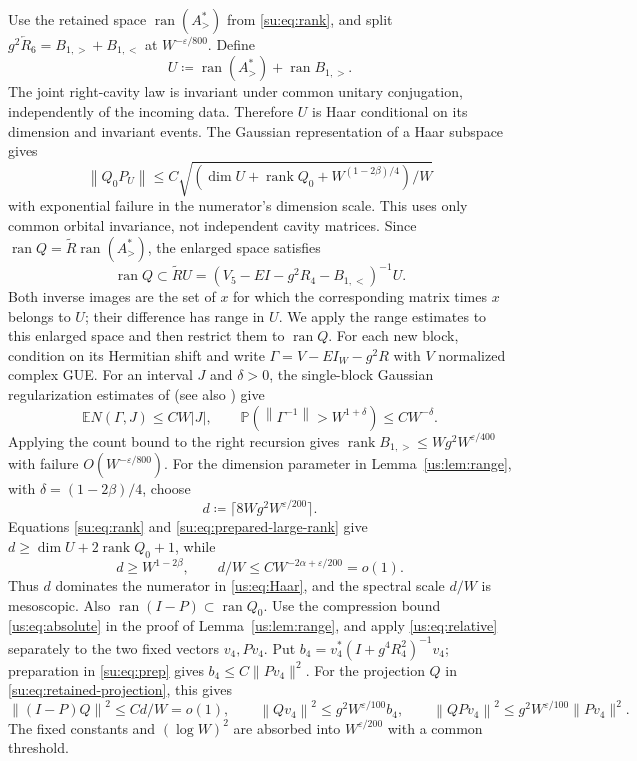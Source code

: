 \documentclass[11pt]{article}
\numberwithin{equation}{section}
\theoremstyle{remark}
\newcommand{\E}{\mathbb E}
\newcommand{\Prob}{\mathbb P}
\newcommand{\rank}{\operatorname{rank}}
\newcommand{\ran}{\operatorname{ran}}
\newcommand{\norm}[1]{\left\|#1\right\|}
\begin{document}
Use the retained space $\ran(A_>^*)$ from \eqref{su:eq:rank}, and split $g^2 \overleftarrow R_6=B_{1,>}+B_{1,<}$ at $W^{-\varepsilon/800}$.
Define
\[
 U\coloneqq \ran(A_>^*)+\ran B_{1,>}.
\]
The joint right-cavity law is invariant under
common unitary conjugation, independently of the incoming data. Therefore
$U$ is Haar conditional on its dimension and invariant events.
The Gaussian representation of a Haar subspace gives
\begin{equation}
 \norm{Q_0P_U}\le C\sqrt{(\dim U+\rank Q_0+W^{(1-2\beta)/4})/W}
 \label{us:eq:Haar}
\end{equation}
with exponential failure in the numerator's dimension scale.
This uses only common orbital invariance, not independent cavity matrices.
Since $\ran Q=\widetilde R\ran(A_>^*)$, the enlarged space satisfies
\begin{equation}
 \ran Q\subset\widetilde RU
  =(V_5-EI-g^2R_4-B_{1,<})^{-1}U.
 \label{us:eq:erase}
\end{equation}
Both inverse images are the set of $x$ for which the corresponding
matrix times $x$ belongs to $U$; their difference has range in $U$.
We apply the range estimates to this enlarged space and then restrict
them to $\ran Q$.
For each new block, condition on its Hermitian shift and write
$\Gamma=V-EI_W-g^2R$ with $V$ normalized complex GUE.
For an interval $J$ and $\delta>0$, the single-block Gaussian regularization
estimates of \cite[Theorem~1]{APSSS} (see also \cite[Theorem~2, (1.10)]{PSSS}) give
\begin{equation}
 \E N(\Gamma,J)\le CW|J|,\qquad
 \Prob(\norm{\Gamma^{-1}}>W^{1+\delta})\le CW^{-\delta}.
 \label{us:eq:wegner}
\end{equation}
Applying the count bound to the right recursion gives
$\rank B_{1,>}\le Wg^2 W^{\varepsilon/400}$ with failure $O(W^{-\varepsilon/800})$.
For the dimension parameter in Lemma~\ref{us:lem:range}, with
$\delta=(1-2\beta)/4$, choose
\begin{equation}\label{su:eq:q}
 d\coloneqq \lceil8Wg^2 W^{\varepsilon/200}\rceil.
\end{equation}
Equations \eqref{su:eq:rank} and \eqref{su:eq:prepared-large-rank} give
$d\ge\dim U+2\rank Q_0+1$, while
\[
 d\ge W^{1-2\beta},\qquad d/W\le CW^{-2\alpha+\varepsilon/200}=o(1).
\]
Thus $d$ dominates the numerator in \eqref{us:eq:Haar}, and the spectral
scale $d/W$ is mesoscopic. Also $\ran(I-P)\subset\ran Q_0$.
Use the compression bound \eqref{us:eq:absolute} in the proof of
Lemma~\ref{us:lem:range}, and apply \eqref{us:eq:relative} separately
to the two fixed vectors $v_4,Pv_4$. Put
$b_4=v_4^*(I+g^4R_4^2)^{-1}v_4$; preparation in \eqref{su:eq:prep}
gives $b_4\le C\|Pv_4\|^2$. For the projection $Q$ in
\eqref{su:eq:retained-projection}, this gives
\begin{equation}\label{su:eq:geometry}
 \norm{(I-P)Q}^2\le Cd/W=o(1),\qquad
 \norm{Qv_4}^2\le g^2 W^{\varepsilon/100}b_4,\qquad
 \norm{QPv_4}^2\le g^2 W^{\varepsilon/100}\|Pv_4\|^2.
\end{equation}
The fixed constants and $(\log W)^2$ are absorbed into $W^{\varepsilon/200}$
with a common threshold.
\end{document}

